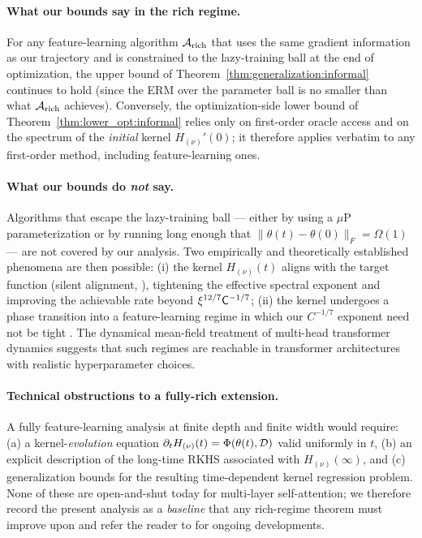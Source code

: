 \documentclass[11pt]{article}
\theoremstyle{plain}
\begin{document}
\paragraph{What our bounds say in the rich regime.}
For any feature-learning algorithm ${\cal A}_{\rm rich}$ that uses the same gradient information as our trajectory and is constrained to the lazy-training ball at the end of optimization, the upper bound of Theorem~\ref{thm:generalization:informal} continues to hold (since the ERM over the parameter ball is no smaller than what ${\cal A}_{\rm rich}$ achieves). Conversely, the optimization-side lower bound of Theorem~\ref{thm:lower_opt:informal} relies only on first-order oracle access and on the spectrum of the {\it initial} kernel $H_{(\nu)}'(0)$; it therefore applies verbatim to any first-order method, including feature-learning ones.

\paragraph{What our bounds do {\it not} say.}
Algorithms that escape the lazy-training ball --- either by using a $\mu$P parameterization \citep{ynh+22} or by running long enough that $\|\theta(t)-\theta(0)\|_F = \Omega(1)$ --- are not covered by our analysis. Two empirically and theoretically established phenomena are then possible: (i) the kernel $H_{(\nu)}(t)$ aligns with the target function (silent alignment, \citealp{abp+21}), tightening the effective spectral exponent and improving the achievable rate beyond $\xi^{12/7}{\sf C}^{-1/7}$; (ii) the kernel undergoes a phase transition into a feature-learning regime in which our $C^{-1/7}$ exponent need not be tight \citep{boc+25, bap24}. The dynamical mean-field treatment of multi-head transformer dynamics \citep{bcp24} suggests that such regimes are reachable in transformer architectures with realistic hyperparameter choices.

\paragraph{Technical obstructions to a fully-rich extension.}
A fully feature-learning analysis at finite depth and finite width would require: (a) a kernel-{\it evolution} equation $\partial_t H_{(\nu)}(t) = \Phi(\theta(t), {\cal D})$ valid uniformly in $t$, (b) an explicit description of the long-time RKHS associated with $H_{(\nu)}(\infty)$, and (c) generalization bounds for the resulting time-dependent kernel regression problem. None of these are open-and-shut today for multi-layer self-attention; we therefore record the present analysis as a {\it baseline} that any rich-regime theorem must improve upon and refer the reader to \citep{boc+25, bap24, bcp24, ynh+22, ks24_nonlinear} for ongoing developments.
\end{document}
